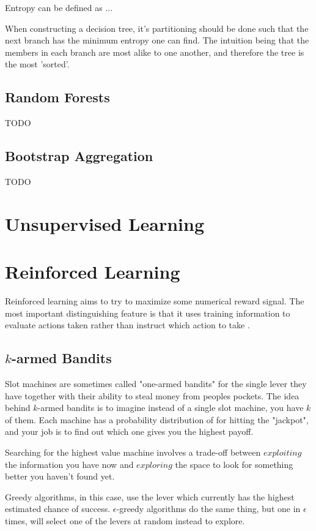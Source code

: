 Entropy can be defined as ...


When constructing a decision tree, it's partitioning should be done such that the next branch has the minimum entropy one can find. The intuition being that the members in each branch are most alike to one another, and therefore the tree is the most 'sorted'.

\subsection{Random Forests}
TODO
\subsection{Bootstrap Aggregation}
TODO

\section{Unsupervised Learning}

\section{Reinforced Learning}
Reinforced learning aims to try to maximize some numerical reward signal. The most important distinguishing feature is that it uses training information to evaluate actions taken rather than instruct which action to take \cite{sutton}.


\subsection{$k$-armed Bandits}
Slot machines are sometimes called "one-armed bandits" for the single lever they have together with their ability to steal money from peoples pockets. The idea behind $k$-armed bandits is to imagine instead of a single slot machine, you have $k$ of them. Each machine has a probability distribution of for hitting the "jackpot", and your job is to find out which one gives you the highest payoff.

Searching for the highest value machine involves a trade-off between $exploiting$ the information you have now and $exploring$ the space to look for something better you haven't found yet.

Greedy algorithms, in this case, use the lever which currently has the highest estimated chance of success. $\epsilon$-greedy algorithms do the same thing, but one in $\epsilon$ times, will select one of the levers at random instead to explore.


